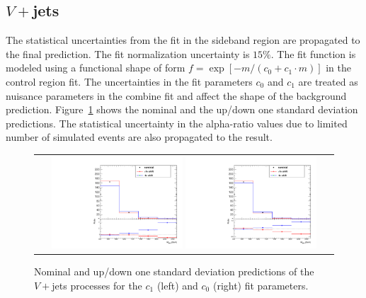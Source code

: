 \subsection{$V+$jets}
The statistical uncertainties from the fit in the sideband region are propagated to the final prediction. The fit normalization uncertainty is $15\%$. The fit function is modeled using a functional shape of form $f=\exp\left[-m/(c_{0}+c_1\cdot m)\right]$ in the control region fit. The uncertainties in the fit parameters $c_{0}$ and $c_{1}$ are treated as nuisance parameters in the combine fit and affect the shape of the background prediction. Figure~\ref{fig:wjet} shows the nominal and the up/down one standard deviation predictions. The statistical uncertainty in the alpha-ratio values due to limited number of simulated events are also propagated to the result. 
%
\begin{figure}[!htbp]
  \begin{center}
    \begin{tabular}{c}
    \includegraphics[width=0.45\textwidth]{Plots/systematic/WjetFitSyst_Par0_Wjets.pdf}%
    \includegraphics[width=0.45\textwidth]{Plots/systematic/WjetFitSyst_Par1_Wjets.pdf}%
    \end{tabular}
    \caption{Nominal and up/down one standard deviation predictions of the $V+$jets processes for the $c_{1}$ (left) and $c_{0}$ (right) fit parameters.}
    \label{fig:wjet}
  \end{center}
\end{figure}

